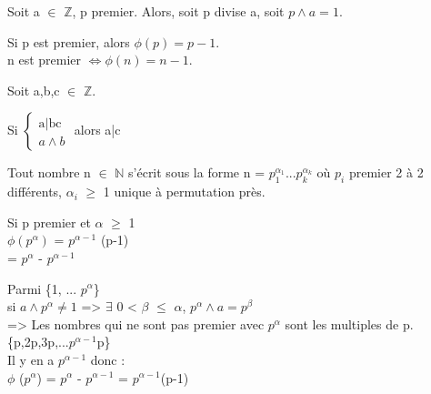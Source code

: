 \begin{cor}
	Soit a $\in$ $\mathbb{Z}$, p premier. Alors, soit p divise a, soit $p \wedge a = 1$.
\end{cor}
\begin{cor}
 Si p est premier, alors $\phi(p) = p-1$.\\
  n est premier $\iff \phi(n) = n-1$.
\end{cor}
\begin{lem}
	Soit a,b,c $\in$ $\mathbb{Z}$.
	\begin{center}
		Si 
		$\left\{
		\begin{array}{ll}
			\mbox{a|bc} \\
			a \wedge b
		\end{array}
		\right.$
		alors a|c
	\end{center}
\end{lem}
\begin{cor}
	Tout nombre n $\in$ $\mathbb{N}$ s'écrit sous la forme n = $p_{1}^{\alpha _{1}} ... p_{k}^{\alpha _{k}}$ où $p_{i}$ premier 2 à 2 différents, $\alpha _{i}$ $\geq$ 1 unique à permutation près.
\end{cor}
\begin{cor}
	Si p premier et $\alpha$ $\geq$ 1 \\
			$\phi(p^{\alpha})$ = $p^{\alpha -1}$ (p-1) \\
			= $p^{\alpha}$ - $p^{\alpha -1}$
\end{cor}
\begin{dem}
	Parmi \{1, ... $p^{\alpha}$\}\\
	si $a \wedge p^{\alpha} \not= 1$ => $\exists$ 0 < $\beta$ $\leq$ $\alpha$, $p^{\alpha} \wedge a = p ^{\beta}$\\
	=> Les nombres qui ne sont pas premier avec $p^{\alpha}$ sont les multiples de p.\\
	\{p,2p,3p,...$p^{\alpha-1}$p\}\\
	Il y en a $p^{\alpha-1}$ donc : \\
	$\phi$ ($p^{\alpha}$) 	= $p^{\alpha}$ - $p^{\alpha-1}$
							= $p^{\alpha-1}$(p-1)
\end{dem}					
	
